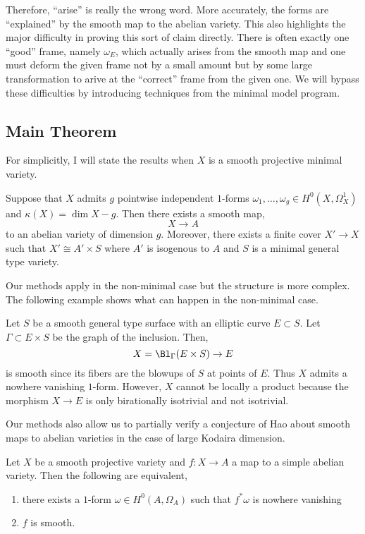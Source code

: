 \documentclass[12pt]{article}
\begin{document}
Therefore, ``arise'' is really the wrong word. More accurately, the forms are ``explained'' by the smooth map to the abelian variety. This also highlights the major difficulty in proving this sort of claim directly. There is often exactly one ``good'' frame, namely $\omega_E$, which actually arises from the smooth map and one must deform the given frame not by a small amount but by some large transformation to arive at the ``correct'' frame from the given one. We will bypass these difficulties by introducing techniques from the minimal model program.  

\subsection{Main Theorem}

For simplicitly, I will state the results when $X$ is a smooth projective minimal variety. 

\begin{theorem}[CCH, '23]
Suppose that $X$ admits $g$ pointwise independent $1$-forms $\omega_1, \dots, \omega_g \in H^0(X, \Omega_X^1)$ and $\kappa(X) = \dim{X} - g$. Then there exists a smooth map,
\[ X \to A \]
to an abelian variety of dimension $g$. Moreover, there exists a finite \etale cover $X' \to X$ such that $X' \cong A' \times S$ where $A'$ is isogenous to $A$ and $S$ is a minimal general type variety.
\end{theorem}

Our methods apply in the non-minimal case but the structure is more complex. The following example shows what can happen in the non-minimal case.

\begin{example}
Let $S$ be a smooth general type surface with an elliptic curve $E \subset S$. Let $\Gamma \subset E \times S$ be the graph of the inclusion. Then,
\[ X = \Bl_{\Gamma}(E \times S) \to E \]
is smooth since its fibers are the blowups of $S$ at points of $E$. Thus $X$ admits a nowhere vanishing $1$-form. However, $X$ cannot be \etale locally a product because the morphism $X \to E$ is only birationally isotrivial and not isotrivial.
\end{example}

Our methods also allow us to partially verify a conjecture of Hao about smooth maps to abelian varieties in the case of large Kodaira dimension.

\begin{conj}[Hao]
Let $X$ be a smooth projective variety and $f : X \to A$ a map to a simple abelian variety. Then the following are equivalent,
\begin{enumerate}
\item there exists a $1$-form $\omega \in H^0(A, \Omega_A)$ such that $f^* \omega$ is nowhere vanishing
\item $f$ is smooth.
\end{enumerate}
\end{conj}
\end{document}
